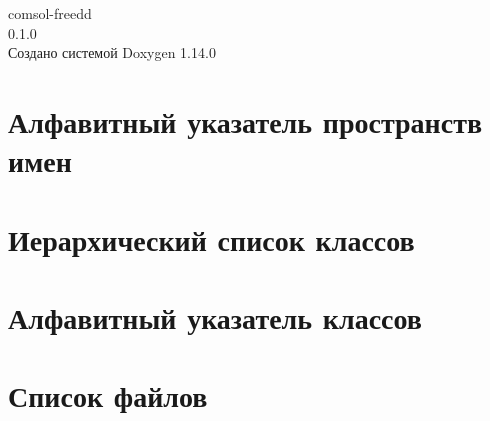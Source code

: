 \documentclass[twoside]{book}
\newcommand{\+}{\discretionary{\mbox{\scriptsize$\hookleftarrow$}}{}{}}
\newcommand{\clearemptydoublepage}{%
    \newpage{\pagestyle{empty}\cleardoublepage}%
  }
\begin{document}
  \raggedbottom
    \hypersetup{pageanchor=false,
                bookmarksnumbered=true,
                pdfencoding=unicode
               }
  \begin{titlepage}
  \vspace*{7cm}
  \begin{center}%
  {\Large comsol-\/freedd}\\
  [1ex]\large 0.\+1.\+0 \\
  \vspace*{1cm}
  {\large Создано системой Doxygen 1.14.0}\\
  \end{center}
  \end{titlepage}
  \clearemptydoublepage
  \tableofcontents
  \clearemptydoublepage
  \hypersetup{pageanchor=true}
\chapter{Алфавитный указатель пространств имен}

\chapter{Иерархический список классов}

\chapter{Алфавитный указатель классов}

\chapter{Список файлов}

\end{document}

